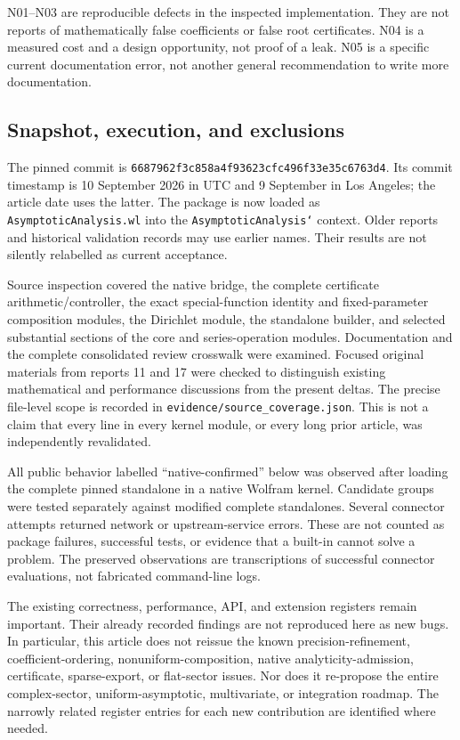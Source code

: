 \documentclass[11pt]{article}
\newcommand{\code}[1]{\texttt{#1}}
\newcommand{\pin}{6687962f3c858a4f93623cfc496f33e35c6763d4}
\begin{document}
N01--N03 are reproducible defects in the inspected implementation. They are not reports of mathematically false coefficients or false root certificates. N04 is a measured cost and a design opportunity, not proof of a leak. N05 is a specific current documentation error, not another general recommendation to write more documentation.

\subsection{Snapshot, execution, and exclusions}
The pinned commit is \code{\pin}. Its commit timestamp is 10 September 2026 in UTC and 9 September in Los Angeles; the article date uses the latter. The package is now loaded as \code{AsymptoticAnalysis.wl} into the \code{AsymptoticAnalysis`} context. Older reports and historical validation records may use earlier names. Their results are not silently relabelled as current acceptance.\cite{commit,readme,contracts}

Source inspection covered the native bridge, the complete certificate arithmetic/controller, the exact special-function identity and fixed-parameter composition modules, the Dirichlet module, the standalone builder, and selected substantial sections of the core and series-operation modules. Documentation and the complete consolidated review crosswalk were examined. Focused original materials from reports 11 and 17 were checked to distinguish existing mathematical and performance discussions from the present deltas. The precise file-level scope is recorded in \code{evidence/source\_coverage.json}. This is not a claim that every line in every kernel module, or every long prior article, was independently revalidated.

All public behavior labelled ``native-confirmed'' below was observed after loading the complete pinned standalone in a native Wolfram kernel. Candidate groups were tested separately against modified complete standalones. Several connector attempts returned network or upstream-service errors. These are not counted as package failures, successful tests, or evidence that a built-in cannot solve a problem. The preserved observations are transcriptions of successful connector evaluations, not fabricated command-line logs.

The existing correctness, performance, API, and extension registers remain important. Their already recorded findings are not reproduced here as new bugs. In particular, this article does not reissue the known precision-refinement, coefficient-ordering, nonuniform-composition, native analyticity-admission, certificate, sparse-export, or flat-sector issues. Nor does it re-propose the entire complex-sector, uniform-asymptotic, multivariate, or integration roadmap. The narrowly related register entries for each new contribution are identified where needed.\cite{register,r11,r17}
\end{document}
